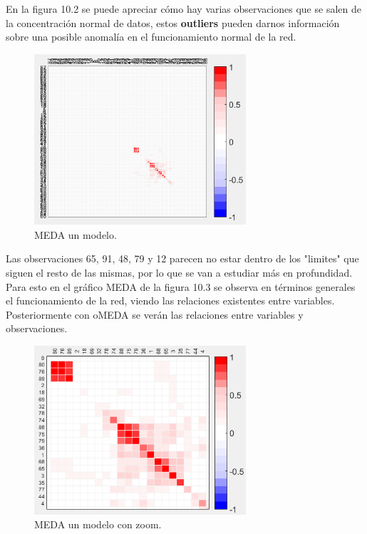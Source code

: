 \bigskip

En la figura 10.2 se puede apreciar cómo hay varias observaciones que se salen de la concentración normal de datos, estos \textbf{outliers} pueden darnos información sobre una posible anomalía en el funcionamiento normal de la red.

\begin{figure}[H]
\centering
\includegraphics[width=0.7\textwidth]{imagenes/casoEstudio/10_3.png}
\caption{MEDA un modelo.}
\end{figure}

\bigskip

Las observaciones 65, 91, 48, 79 y 12 parecen no estar dentro de los "limites" que siguen el resto de las mismas, por lo que se van a estudiar más en profundidad. Para esto en el gráfico MEDA de la figura 10.3 se observa en términos generales el funcionamiento de la red, viendo las relaciones existentes entre variables. Posteriormente con oMEDA se verán las relaciones entre variables y observaciones.

\begin{figure}[!ht]
\centering
\includegraphics[width=0.7\textwidth]{imagenes/casoEstudio/10_4.png}
\caption{MEDA un modelo con zoom.}
\end{figure}


